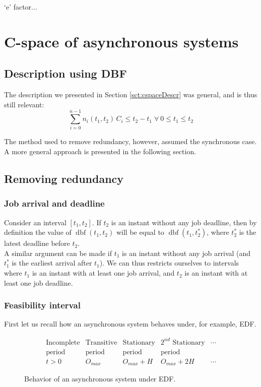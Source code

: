 \documentclass[times, 10pt,twocolumn, a4paper]{article}
\newcommand{\dbf}[1]{\operatorname{dbf}(#1)}
\begin{document}
  `e' factor...

\section{C-space of asynchronous systems}
  \label{sct:asyncCspace}

  \subsection{Description using DBF}

  The description we presented in Section \ref{sct:cspaceDescr} was general, and is thus still relevant: $$\sum_{i=0}^{n-1} n_i(t_1, t_2) \, C_i \leq t_2 - t_1 \; \forall \: 0 \leq t_1 \leq t_2$$

  The method used to remove redundancy, however, assumed the synchronous case. A more general approach is presented in the following section.

  \subsection{Removing redundancy}

\subsubsection{Job arrival and deadline}

Consider an interval $[t_1, t_2]$. If $t_2$ is an instant without any job deadline, then by definition the value of $\dbf{t_1, t_2}$ will be equal to $\dbf{t_1, t_2^*}$, where $t_2^*$ is the latest deadline before $t_2$.\\

A similar argument can be made if $t_1$ is an instant without any job arrival (and $t_1^*$ is the earliest arrival after $t_1$). We can thus restricts ourselves to intervals where $t_1$ is an instant with at least one job arrival, and $t_2$ is an instant with at least one job deadline.

  \subsubsection{Feasibility interval}

  First let us recall how an asynchronous system behaves under, for example, EDF.\\

\begin{figure}[h]
$$
\begin{array}{|c|c|c|c|l}
   \text{Incomplete} & \text{Transitive} & \text{Stationary} & \text{$2^{nd}$ Stationary} & \cdots \\
   \text{period} & \text{period} & \text{period} & \text{period} & \\
  \hline
  t > 0 & O_{max} & O_{max} + H & O_{max} + 2H & \cdots
\end{array}
$$
\begin{center}
\caption{Behavior of an asynchronous system under EDF.}
\label{fig:asyncBehavior}
\end{center}
\end{figure}
\end{document}
